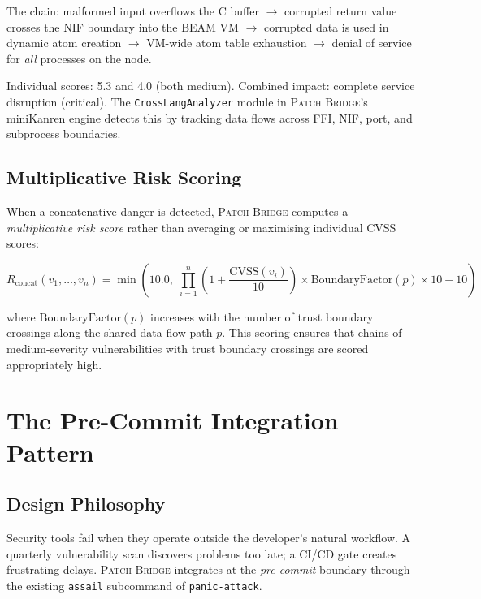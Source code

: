 \documentclass[11pt,twocolumn]{article}
\begin{document}
The chain: malformed input overflows the C buffer $\to$ corrupted
return value crosses the NIF boundary into the BEAM VM $\to$ corrupted
data is used in dynamic atom creation $\to$ VM-wide atom table
exhaustion $\to$ denial of service for \emph{all} processes on the
node.

Individual scores: 5.3 and 4.0 (both medium). Combined impact:
complete service disruption (critical). The \texttt{CrossLangAnalyzer}
module in \textsc{Patch Bridge}'s miniKanren engine detects this by
tracking data flows across FFI, NIF, port, and subprocess boundaries.

\subsection{Multiplicative Risk Scoring}

When a concatenative danger is detected, \textsc{Patch Bridge}
computes a \emph{multiplicative risk score} rather than averaging
or maximising individual CVSS scores:

\begin{equation}
  R_{\text{concat}}(v_1, \ldots, v_n) =
  \min\left(10.0,\;
    \prod_{i=1}^{n} \left(1 + \frac{\text{CVSS}(v_i)}{10}\right)
    \times \text{BoundaryFactor}(p) \times 10
    - 10
  \right)
\label{eq:concat-risk}
\end{equation}

where $\text{BoundaryFactor}(p)$ increases with the number of trust
boundary crossings along the shared data flow path $p$. This scoring
ensures that chains of medium-severity vulnerabilities with trust
boundary crossings are scored appropriately high.

\section{The Pre-Commit Integration Pattern}
\label{sec:precommit}

\subsection{Design Philosophy}

Security tools fail when they operate outside the developer's natural
workflow. A quarterly vulnerability scan discovers problems too late;
a CI/CD gate creates frustrating delays. \textsc{Patch Bridge}
integrates at the \emph{pre-commit} boundary through the existing
\texttt{assail} subcommand of \texttt{panic-attack}.
\end{document}
